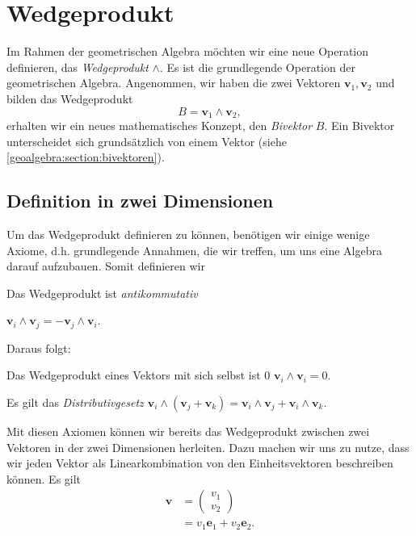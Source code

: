 
\section{Wedgeprodukt
\label{geoalgebra:section:wedgeprodukt}}

Im Rahmen der geometrischen Algebra möchten wir eine neue Operation
definieren, das \emph{Wedgeprodukt} $\wedge$.
Es ist die grundlegende Operation der geometrischen
Algebra.
Angenommen, wir haben die
zwei Vektoren $\mathbf{v}_1, \mathbf{v}_2$ und bilden das Wedgeprodukt
\begin{equation}
  B = \mathbf{v}_1 \wedge \mathbf{v}_2,
\end{equation}
erhalten wir ein neues mathematisches Konzept, den \emph{Bivektor} $B$.
Ein Bivektor unterscheidet sich grundsätzlich von einem Vektor (siehe \autoref{geoalgebra:section:bivektoren}).

\subsection{Definition in zwei Dimensionen}
Um das Wedgeprodukt definieren zu können, benötigen wir einige wenige Axiome, d.h. grundlegende Annahmen, die wir treffen,
um uns eine Algebra darauf aufzubauen. Somit definieren wir

\begin{axiom}
  Das Wedgeprodukt ist \em{antikommutativ}

  $
  \mathbf{v}_i \wedge \mathbf{v}_j = -\mathbf{v}_j \wedge \mathbf{v}_i
  $.
  \label{geoalgebra:axiom:antikommutativ}
\end{axiom}
Daraus folgt:
\begin{lemma}
  Das Wedgeprodukt eines Vektors mit sich selbst ist $0$
  $
  \mathbf{v}_i \wedge \mathbf{v}_i = 0
  $.
\end{lemma}

\begin{axiom}
  Es gilt das \em{Distributivgesetz}
  $
  \mathbf{v}_i \wedge (\mathbf{v}_j + \mathbf{v}_k) = \mathbf{v}_i \wedge \mathbf{v}_j + \mathbf{v}_i \wedge \mathbf{v}_k
  $.
\end{axiom}

Mit diesen Axiomen können wir bereits das Wedgeprodukt zwischen zwei
Vektoren in der zwei Dimensionen herleiten.
Dazu machen wir uns zu nutze, dass wir jeden Vektor als
Linearkombination von den Einheitsvektoren beschreiben können.
Es gilt
\begin{align}
  \mathbf{v} &= \begin{pmatrix} v_1 \\ v_2 \end{pmatrix} \\
    &= v_1 \mathbf{e}_1 + v_2 \mathbf{e}_2.
\end{align}

